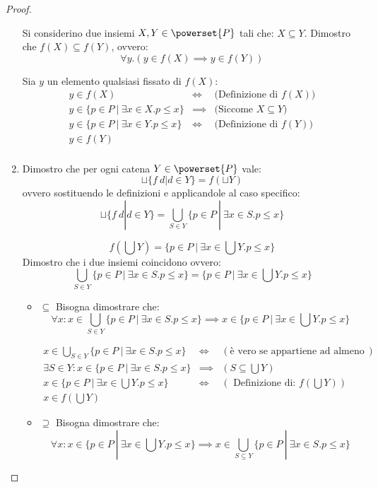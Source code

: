\begin{proof}
\begin{enumerate}
    Si considerino due insiemi $X, Y \in \powerset{P}$ tali che:
    $X \subseteq Y$. Dimostro che $f(X) \subseteq f(Y)$, ovvero:
    $$
    \forall y.(y \in f(X) \implies y \in f(Y))
    $$
    
    Sia $y$ un elemento qualsiasi fissato di $f(X)$:
    $$
    \begin{array}{llr}
     y \in f(X) & \iff & \text{(Definizione di $f(X))$}\\
     y \in \{p \in P\ |\ \exists x \in X. p \leq x \} & \implies & \text{(Siccome $X \subseteq Y$) } \\
     y \in \{p \in P\ |\ \exists x \in Y. p \leq x \} & \iff &
     \text{(Definizione di $f(Y)$)} \\
     y \in f(Y) & & \\
    \end{array}
    $$

\item Dimostro che per ogni catena $Y \in \powerset{P}$ vale:  
$$
\sqcup\{f\ d | d \in Y\} = f(\sqcup Y)
$$
ovvero sostituendo le definizioni e applicandole al caso specifico:
$$
\sqcup\{f\ d | d \in Y\} = \bigcup_{S \in Y} \{p \in P\ |\ \exists x \in S. p \leq x\}
$$

$$
f(\bigcup Y) = \{p \in P\ |\ \exists x \in \bigcup Y. p \leq x\}
$$
Dimostro che i due insiemi coincidono ovvero:
$$
\bigcup_{S \in Y} \{p \in P\ |\ \exists x \in S. p \leq x\} =  \{p \in P\ |\ \exists x \in \bigcup Y. p \leq x\}
$$
\begin{itemize}
	\item $\boxed{\subseteq}$ Bisogna dimostrare che:
	$$
	\forall x : x \in \bigcup_{S \in Y} \{p \in P\ |\ \exists x \in S. p \leq x\} \implies x \in \{p \in P\ |\ \exists x \in \bigcup Y. p \leq x\}
	$$
	
	$$
	\begin{array}{llr}
	x \in \bigcup_{S \in Y} \{p \in P\ |\ \exists x \in S. p \leq x\} & \iff & (\text{è vero se appartiene ad almeno un sottinsieme di Y})\\
	\exists S \in Y: x \in \{p \in P\ |\ \exists x \in S. p \leq x\} & \implies & (S \subseteq \bigcup Y)\\
	x \in \{p \in P\ |\ \exists x \in \bigcup Y. p \leq x \} & \iff & (\text{ Definizione di: } f(\bigcup Y)) \\
	x \in f(\bigcup Y)
	\end{array}
	$$
	\item $\boxed{\supseteq}$ Bisogna dimostrare che:
	$$
	\forall x : x \in \{p \in P\ |\ \exists x \in \bigcup Y. p \leq x\} \implies x \in 
	\bigcup_{S \subseteq Y} \{p \in P\ |\ \exists x \in S. p \leq x\} 
	$$ 
	

\end{itemize}
\end{enumerate}
\end{proof}
